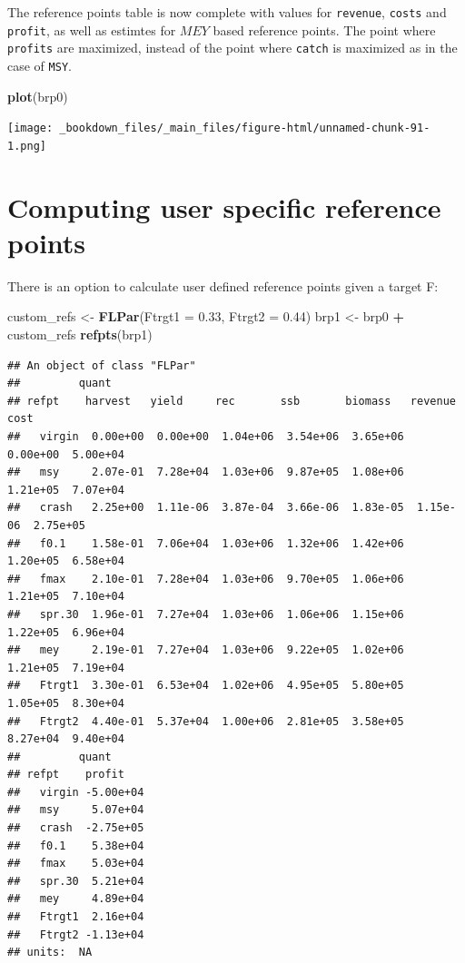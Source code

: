 \documentclass[
]{book}
\newenvironment{Shaded}{\begin{snugshade}}{\end{snugshade}}
\newcommand{\AttributeTok}[1]{\textcolor[rgb]{0.13,0.29,0.53}{#1}}
\newcommand{\FloatTok}[1]{\textcolor[rgb]{0.00,0.00,0.81}{#1}}
\newcommand{\FunctionTok}[1]{\textcolor[rgb]{0.13,0.29,0.53}{\textbf{#1}}}
\newcommand{\NormalTok}[1]{#1}
\newcommand{\OtherTok}[1]{\textcolor[rgb]{0.56,0.35,0.01}{#1}}
\newcommand{\SpecialCharTok}[1]{\textcolor[rgb]{0.81,0.36,0.00}{\textbf{#1}}}
\begin{document}
The reference points table is now complete with values for \texttt{revenue}, \texttt{costs} and \texttt{profit}, as well as estimtes for \(MEY\) based reference points. The point where \texttt{profits} are maximized, instead of the point where \texttt{catch} is maximized as in the case of \texttt{MSY}.

\begin{Shaded}
\begin{Highlighting}[]
\FunctionTok{plot}\NormalTok{(brp0)}
\end{Highlighting}
\end{Shaded}

\texttt{[image: \_bookdown\_files/\_main\_files/figure-html/unnamed-chunk-91-1.png]}

\hypertarget{computing-user-specific-reference-points}{%
\section{Computing user specific reference points}\label{computing-user-specific-reference-points}}

There is an option to calculate user defined reference points given a target F:

\begin{Shaded}
\begin{Highlighting}[]
\NormalTok{custom\_refs }\OtherTok{\textless{}{-}} \FunctionTok{FLPar}\NormalTok{(}\AttributeTok{Ftrgt1 =} \FloatTok{0.33}\NormalTok{, }\AttributeTok{Ftrgt2 =} \FloatTok{0.44}\NormalTok{)}
\NormalTok{brp1 }\OtherTok{\textless{}{-}}\NormalTok{ brp0 }\SpecialCharTok{+}\NormalTok{ custom\_refs}
\FunctionTok{refpts}\NormalTok{(brp1)}
\end{Highlighting}
\end{Shaded}

\begin{verbatim}
## An object of class "FLPar"
##         quant
## refpt    harvest   yield     rec       ssb       biomass   revenue   cost     
##   virgin  0.00e+00  0.00e+00  1.04e+06  3.54e+06  3.65e+06  0.00e+00  5.00e+04
##   msy     2.07e-01  7.28e+04  1.03e+06  9.87e+05  1.08e+06  1.21e+05  7.07e+04
##   crash   2.25e+00  1.11e-06  3.87e-04  3.66e-06  1.83e-05  1.15e-06  2.75e+05
##   f0.1    1.58e-01  7.06e+04  1.03e+06  1.32e+06  1.42e+06  1.20e+05  6.58e+04
##   fmax    2.10e-01  7.28e+04  1.03e+06  9.70e+05  1.06e+06  1.21e+05  7.10e+04
##   spr.30  1.96e-01  7.27e+04  1.03e+06  1.06e+06  1.15e+06  1.22e+05  6.96e+04
##   mey     2.19e-01  7.27e+04  1.03e+06  9.22e+05  1.02e+06  1.21e+05  7.19e+04
##   Ftrgt1  3.30e-01  6.53e+04  1.02e+06  4.95e+05  5.80e+05  1.05e+05  8.30e+04
##   Ftrgt2  4.40e-01  5.37e+04  1.00e+06  2.81e+05  3.58e+05  8.27e+04  9.40e+04
##         quant
## refpt    profit   
##   virgin -5.00e+04
##   msy     5.07e+04
##   crash  -2.75e+05
##   f0.1    5.38e+04
##   fmax    5.03e+04
##   spr.30  5.21e+04
##   mey     4.89e+04
##   Ftrgt1  2.16e+04
##   Ftrgt2 -1.13e+04
## units:  NA
\end{verbatim}
\end{document}
